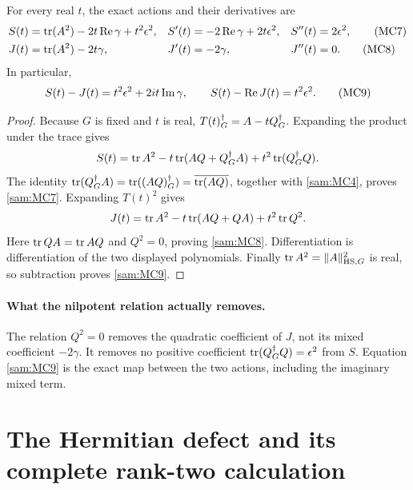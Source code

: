 \documentclass[11pt]{article}
\begin{document}
\begin{samtheorem}
For every real \(t\), the exact actions and their derivatives are
\begin{align}
 S(t)&=\operatorname{tr}(A^2)-2t\operatorname{Re}\gamma+t^2\epsilon^2,
 & S'(t)&=-2\operatorname{Re}\gamma+2t\epsilon^2,
 & S''(t)&=2\epsilon^2, \tag{MC7}\label{sam:MC7}\\
 J(t)&=\operatorname{tr}(A^2)-2t\gamma,
 & J'(t)&=-2\gamma,
 & J''(t)&=0. \tag{MC8}\label{sam:MC8}
\end{align}
In particular,
\begin{equation}
 S(t)-J(t)=t^2\epsilon^2+2it\operatorname{Im}\gamma,\qquad
 S(t)-\operatorname{Re} J(t)=t^2\epsilon^2.
 \tag{MC9}\label{sam:MC9}
\end{equation}
\end{samtheorem}
\begin{proof}
Because \(G\) is fixed and \(t\) is real,
\(T(t)^\dagger_G=A-tQ^\dagger_G\). Expanding the product under the trace gives
\[
 S(t)=\operatorname{tr} A^2-t\operatorname{tr}(AQ+Q^\dagger_G A)+t^2\operatorname{tr}(Q^\dagger_G Q).
\]
The identity
\(\operatorname{tr}(Q^\dagger_G A)=\operatorname{tr}((AQ)^\dagger_G)=\overline{\operatorname{tr}(AQ)}\),
together with \eqref{sam:MC4}, proves \eqref{sam:MC7}. Expanding \(T(t)^2\)
gives
\[
 J(t)=\operatorname{tr} A^2-t\operatorname{tr}(AQ+QA)+t^2\operatorname{tr} Q^2.
\]
Here \(\operatorname{tr} QA=\operatorname{tr} AQ\) and \(Q^2=0\), proving \eqref{sam:MC8}.
Differentiation is differentiation of the two displayed polynomials.
Finally \(\operatorname{tr} A^2=\|A\|_{\mathrm{HS},G}^2\) is real, so subtraction
proves \eqref{sam:MC9}.
\end{proof}

\paragraph{What the nilpotent relation actually removes.}
The relation \(Q^2=0\) removes the quadratic coefficient of \(J\), not
its mixed coefficient \(-2\gamma\). It removes no positive coefficient
\(\operatorname{tr}(Q^\dagger_G Q)=\epsilon^2\) from \(S\). Equation \eqref{sam:MC9} is
the exact map between the two actions, including the imaginary mixed term.

\section{The Hermitian defect and its complete rank-two calculation}
\end{document}
